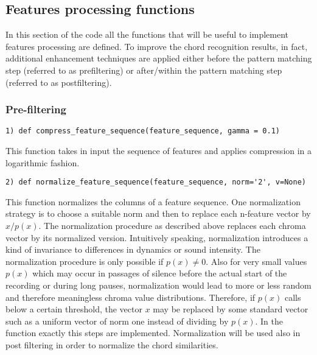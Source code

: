 \documentclass{article}
\begin{document}
\subsection{Features processing functions}
In this section of the code all the functions that will be useful to implement features processing are defined. To improve the chord recognition results, in fact, additional enhancement techniques are applied either before the pattern matching step (referred to as prefiltering) or after/within the pattern matching step (referred to as postfiltering). 

\subsubsection{Pre-filtering}

\begin{lstlisting}
1) def compress_feature_sequence(feature_sequence, gamma = 0.1)
\end{lstlisting}
This function takes in input the sequence of features and applies compression in a logarithmic fashion.
\begin{lstlisting}
2) def normalize_feature_sequence(feature_sequence, norm='2', v=None)
\end{lstlisting}
This function normalizes the columns of a feature sequence. One normalization strategy is to choose a suitable norm  and then to replace each n-feature vector  by \begin{math} x/p(x) \end{math}.
The normalization procedure as described above replaces each chroma vector by its normalized version. Intuitively speaking, normalization introduces a kind of invariance to differences in dynamics or sound intensity.
The normalization procedure is only possible if \begin{math}p(x) \neq 0
\end{math}. Also for very small values \begin{math}p(x) \end{math} which may occur in passages of silence before the actual start of the recording or during long pauses, normalization would lead to more or less random and therefore meaningless chroma value distributions. Therefore, if \begin{math}p(x) \end{math} calls below a certain threshold, the vector \begin{math}x \end{math} may be replaced by some standard vector such as a uniform vector of norm one instead of dividing by \begin{math}p(x) \end{math}. In the function exactly this steps are implemented.
Normalization will be used also in post filtering in order to normalize the chord similarities.
\end{document}
